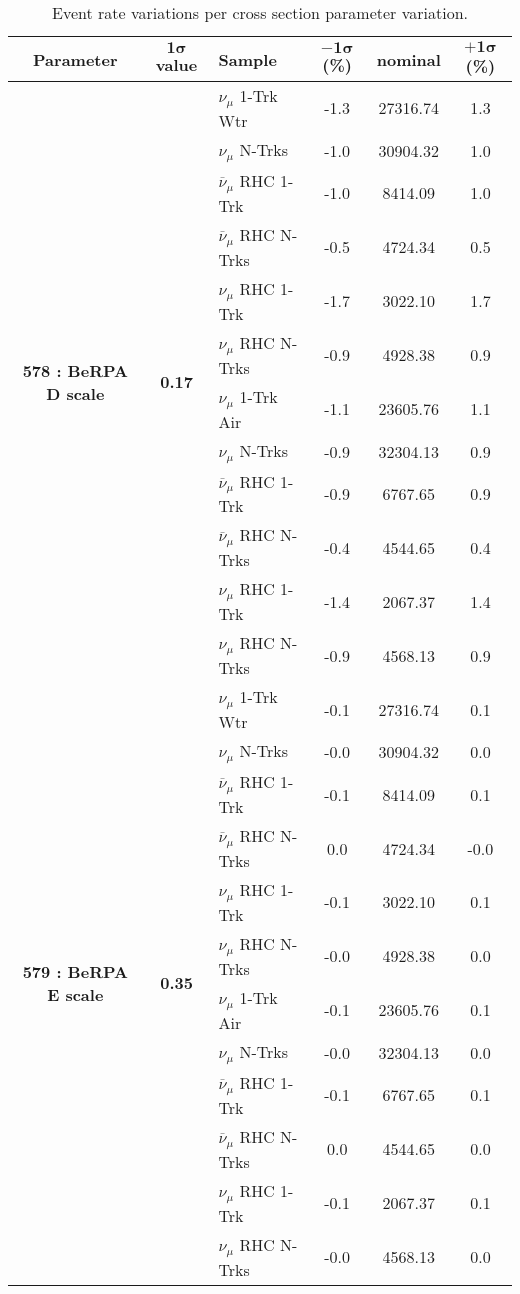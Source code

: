 \addtocounter{table}{-1}
\begin{table}[ht!]
\centering
\begin{tabular}{ c  c  l  c  c  c }
\midrule[1.3pt]
\textbf{Parameter} & \textbf{$\mathbf{1\sigma}$ value} & \textbf{Sample} & \textbf{$\mathbf{-1\sigma}$ (\%)}  &  \textbf{nominal}  &  \textbf{$\mathbf{+1\sigma}$ (\%)} \\
\midrule[1.3pt]
\multirow{12}{*}{\textbf{578 : BeRPA D scale}} & \multirow{12}{*}{\textbf{0.17}} & $\nu_\mu$ 1-Trk Wtr &   -1.3 &  27316.74 &   1.3 \\ 
 &  & $\nu_\mu$ N-Trks &   -1.0 &  30904.32 &   1.0 \\ 
 &  & $\overline{\nu}_\mu$ RHC 1-Trk &   -1.0 &  8414.09 &   1.0 \\ 
 &  & $\overline{\nu}_\mu$ RHC N-Trks &   -0.5 &  4724.34 &   0.5 \\ 
 &  & $\nu_\mu$ RHC 1-Trk &   -1.7 &  3022.10 &   1.7 \\ 
 &  & $\nu_\mu$ RHC N-Trks &   -0.9 &  4928.38 &   0.9 \\ 
 &  & $\nu_\mu$ 1-Trk Air &   -1.1 &  23605.76 &   1.1 \\ 
 &  & $\nu_\mu$ N-Trks &   -0.9 &  32304.13 &   0.9 \\ 
 &  & $\overline{\nu}_\mu$ RHC 1-Trk &   -0.9 &  6767.65 &   0.9 \\ 
 &  & $\overline{\nu}_\mu$ RHC N-Trks &   -0.4 &  4544.65 &   0.4 \\ 
 &  & $\nu_\mu$ RHC 1-Trk &   -1.4 &  2067.37 &   1.4 \\ 
 &  & $\nu_\mu$ RHC N-Trks &   -0.9 &  4568.13 &   0.9 \\ 
\midrule[1.3pt]
\multirow{12}{*}{\textbf{579 : BeRPA E scale}} & \multirow{12}{*}{\textbf{0.35}} & $\nu_\mu$ 1-Trk Wtr &   -0.1 &  27316.74 &   0.1 \\ 
 &  & $\nu_\mu$ N-Trks &   -0.0 &  30904.32 &   0.0 \\ 
 &  & $\overline{\nu}_\mu$ RHC 1-Trk &   -0.1 &  8414.09 &   0.1 \\ 
 &  & $\overline{\nu}_\mu$ RHC N-Trks &   0.0 &  4724.34 &   -0.0 \\ 
 &  & $\nu_\mu$ RHC 1-Trk &   -0.1 &  3022.10 &   0.1 \\ 
 &  & $\nu_\mu$ RHC N-Trks &   -0.0 &  4928.38 &   0.0 \\ 
 &  & $\nu_\mu$ 1-Trk Air &   -0.1 &  23605.76 &   0.1 \\ 
 &  & $\nu_\mu$ N-Trks &   -0.0 &  32304.13 &   0.0 \\ 
 &  & $\overline{\nu}_\mu$ RHC 1-Trk &   -0.1 &  6767.65 &   0.1 \\ 
 &  & $\overline{\nu}_\mu$ RHC N-Trks &   0.0 &  4544.65 &   0.0 \\ 
 &  & $\nu_\mu$ RHC 1-Trk &   -0.1 &  2067.37 &   0.1 \\ 
 &  & $\nu_\mu$ RHC N-Trks &   -0.0 &  4568.13 &   0.0 \\ 
\midrule[1.3pt]
\end{tabular}
\centering
\caption*{Event rate variations per cross section parameter variation.}
\end{table}
